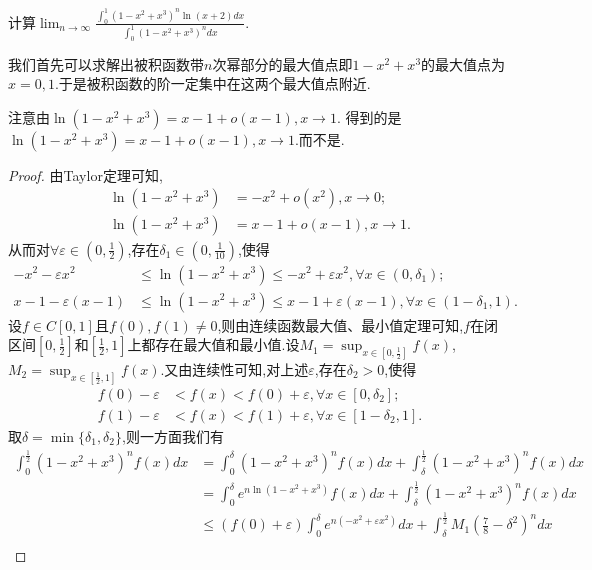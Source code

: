 \documentclass[../../main.tex]{subfiles}
\begin{document}
\begin{example}\label{Laplace方法例题4}
计算$\lim_{n\rightarrow \infty} \frac{\int_0^1{\left( 1-x^2+x^3 \right) ^n\ln \left( x+2 \right) dx}}{\int_0^1{\left( 1-x^2+x^3 \right) ^ndx}}.$
\end{example}
\begin{note}
我们首先可以求解出被积函数带$n$次幂部分的最大值点即$1-x^2+x^3$的最大值点为$x=0,1$.于是被积函数的阶一定集中在这两个最大值点附近.
\end{note}
\begin{remark}
注意由$\ln(1 - x^2 + x^3) = x - 1 + o(x - 1),  x\rightarrow 1$.
得到的是$\ln(1 - x^2 + x^3) = x - 1 + o(x - 1),  x\rightarrow 1$.而不是.
\end{remark}
\begin{proof}
由Taylor定理可知,
\begin{align*}
\ln(1 - x^2 + x^3) &= -x^2 + o(x^2),  x\rightarrow 0;\\
\ln(1 - x^2 + x^3) &= x - 1 + o(x - 1),  x\rightarrow 1.
\end{align*}
从而对\(\forall \varepsilon \in (0,\frac{1}{2})\),存在\(\delta_1 \in (0,\frac{1}{10})\),使得
\begin{align*}
-x^2 - \varepsilon x^2&\leqslant\ln(1 - x^2 + x^3)\leqslant -x^2 + \varepsilon x^2, \forall x\in (0,\delta_1);\\
x - 1 - \varepsilon(x - 1)&\leqslant\ln(1 - x^2 + x^3)\leqslant x - 1 + \varepsilon(x - 1), \forall x\in (1 - \delta_1,1).
\end{align*}
设\(f\in C[0,1]\)且$f(0),f(1)\ne0$,则由连续函数最大值、最小值定理可知,\(f\)在闭区间\([0,\frac{1}{2}]\)和$[\frac{1}{2},1]$上都存在最大值和最小值.设\(M_1 = \sup_{x\in [0,\frac{1}{2}]}f(x)\),\(M_2 = \sup_{x\in [\frac{1}{2},1]}f(x)\).又由连续性可知,对上述\(\varepsilon\),存在\(\delta_2>0\),使得
\begin{align*}
f(0) - \varepsilon&< f(x) < f(0) + \varepsilon, \forall x\in [0,\delta_2];\\
f(1) - \varepsilon&< f(x) < f(1) + \varepsilon, \forall x\in [1 - \delta_2,1].
\end{align*}
取\(\delta = \min\{\delta_1,\delta_2\}\),则一方面我们有
\begin{align*}
\int_0^{\frac{1}{2}}{(1 - x^2 + x^3)^nf(x)dx}&=\int_0^{\delta}{(1 - x^2 + x^3)^nf(x)dx}+\int_{\delta}^{\frac{1}{2}}{(1 - x^2 + x^3)^nf(x)dx}\\
&=\int_0^{\delta}{e^{n\ln(1 - x^2 + x^3)}f(x)dx}+\int_{\delta}^{\frac{1}{2}}{(1 - x^2 + x^3)^nf(x)dx}\\
&\leqslant (f(0) + \varepsilon)\int_0^{\delta}{e^{n(-x^2 + \varepsilon x^2)}dx}+\int_{\delta}^{\frac{1}{2}}{M_1\left(\frac{7}{8}-\delta^2\right)^ndx}\\

\end{align*}
\end{proof}
\end{document}
